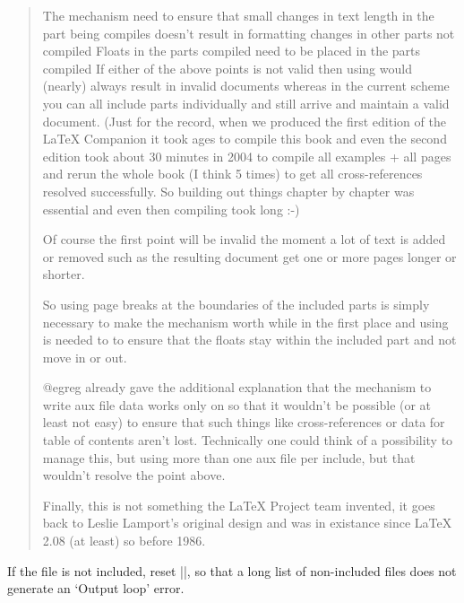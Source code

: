 \begin{multicols}
\begin{macro}{\@include}
\begin{quotation}
The mechanism need to ensure that small changes in text length in the part being compiles doesn't result in formatting changes in other parts not compiled
Floats in the parts compiled need to be placed in the parts compiled
If either of the above points is not valid then using  would (nearly) always result in invalid documents whereas in the current scheme you can all include parts individually and still arrive and maintain a valid document. (Just for the record, when we produced the first edition of the LaTeX Companion it took ages to compile this book and even the second edition took about 30 minutes in 2004 to compile all examples + all pages and rerun the whole book (I think 5 times) to get all cross-references resolved successfully. So building out things chapter by chapter was essential and even then compiling took long :-)

Of course the first point will be invalid the moment a lot of text is added or removed such as the resulting document get one or more pages longer or shorter.

So using page breaks at the boundaries of the included parts is simply necessary to make the mechanism worth while in the first place and using  is needed to to ensure that the floats stay within the included part and not move in or out.

@egreg already gave the additional explanation that the mechanism to write aux file data works only on  so that it wouldn't be possible (or at least not easy) to ensure that such things like cross-references or data for table of contents aren't lost. Technically one could think of a possibility to manage this, but using more than one aux file per include, but that wouldn't resolve the point above.

Finally, this is not something the LaTeX Project team invented, it goes back to Leslie Lamport's original design and was in existance since LaTeX 2.08 (at least) so before 1986.
\end{quotation} 
 \end{macro}
    \begin{teX}
\def\@include#1 {%
  \clearpage
  \if@filesw
    \immediate\write\@mainaux{\string\@input{#1.aux}}%
  \fi
  \@tempswatrue
  \if@partsw
    \@tempswafalse
    \edef\reserved@b{#1}%
    \@for\reserved@a:=\@partlist\do
      {\ifx\reserved@a\reserved@b\@tempswatrue\fi}%
  \fi
  \if@tempswa
    \let\@auxout\@partaux
    \if@filesw
      \immediate\openout\@partaux #1.aux
      \immediate\write\@partaux{\relax}%
    \fi
    \@input@{#1.tex}%
    \clearpage
    \@writeckpt{#1}%
    \if@filesw
      \immediate\closeout\@partaux
    \fi
  \else
     \end{teX}
 If the file is not included, reset |\deadcycles|, so that a long
 list of non-included files does not generate an `Output loop'
 error.


\end{multicols}
